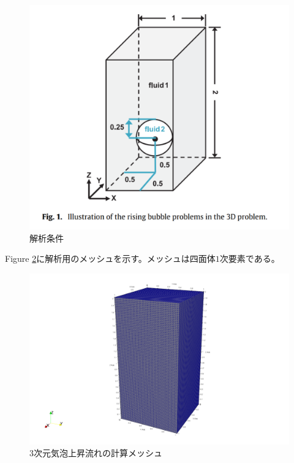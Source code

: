 \documentclass[8pt,a4paper]{article}
\begin{document}
\begin{figure}[H]
	\centering
	\includegraphics[width=10truecm]{pics/3d-bubble/setting.pdf}
	\caption{解析条件\cite{Safi2017}}
	\label{fig:3d-bubble-setting}
\end{figure}

Figure \ref{fig:3d-bubble-mesh}に解析用のメッシュを示す。メッシュは四面体$1$次要素である。

\begin{figure}[H]
	\centering
	\includegraphics[width=10truecm]{pics/3d-bubble/mesh.pdf}
	\caption{3次元気泡上昇流れの計算メッシュ}
	\label{fig:3d-bubble-mesh}
\end{figure}
\end{document}
